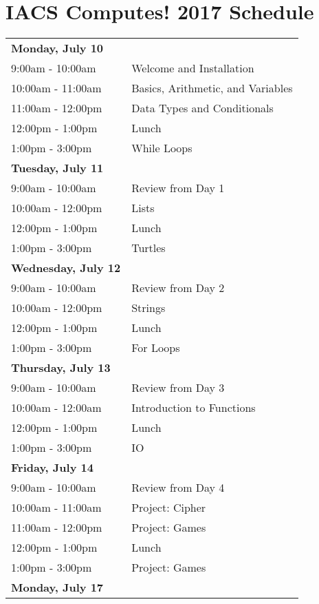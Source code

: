 \documentclass{article}
\begin{document}


\section*{\hfil IACS Computes! 2017 Schedule \hfil}

\begin{tabu} to \textwidth {l X[r]}
\textbf{Monday, July 10} & \\
9:00am - 10:00am & Welcome and Installation \\
10:00am - 11:00am & Basics, Arithmetic, and Variables \\
11:00am - 12:00pm & Data Types and Conditionals \\
12:00pm - 1:00pm & Lunch \\
1:00pm - 3:00pm & While Loops \\
\textbf{Tuesday, July 11} & \\
9:00am - 10:00am & Review from Day 1 \\
10:00am - 12:00pm & Lists \\
12:00pm - 1:00pm & Lunch \\
1:00pm - 3:00pm & Turtles \\
\textbf{Wednesday, July 12} & \\
9:00am - 10:00am & Review from Day 2 \\
10:00am - 12:00pm & Strings \\
12:00pm - 1:00pm & Lunch \\
1:00pm - 3:00pm & For Loops \\
\textbf{Thursday, July 13} & \\
9:00am - 10:00am & Review from Day 3 \\
10:00am - 12:00am & Introduction to Functions \\
12:00pm - 1:00pm & Lunch \\
1:00pm - 3:00pm & IO \\
\textbf{Friday, July 14} & \\
9:00am - 10:00am & Review from Day 4 \\
10:00am - 11:00am & Project: Cipher \\
11:00am - 12:00pm & Project: Games \\
12:00pm - 1:00pm & Lunch \\
1:00pm - 3:00pm & Project: Games \\
\textbf{Monday, July 17} & \\

\end{tabu}
\end{document}

